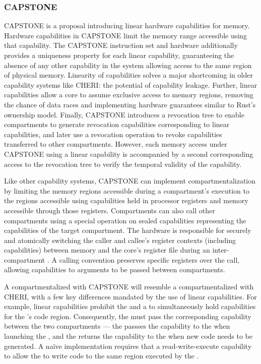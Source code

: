 \subsubsection{CAPSTONE}
CAPSTONE is a proposal introducing linear hardware capabilities for memory.
Hardware capabilities in CAPSTONE limit the memory range accessible
using that capability.
The CAPSTONE instruction set and hardware additionally provides a uniqueness 
property for each linear capability, guaranteeing the absence of any other 
capability in the system allowing access to the same region of 
physical memory.
Linearity of capabilities solves a major shortcoming in older capability
systems like CHERI: the potential of capability leakage.
Further, linear capabilities allow a core to assume exclusive access to
memory regions, removing the chance of data races and implementing
hardware guarantees similar to Rust's ownership model.
Finally, CAPSTONE introduces a revocation tree to enable compartments to
generate revocation capabilities corresponding to linear capabilities,
and later use a revocation operation to revoke capabilities transferred to
other compartments. 
However, each memory access under CAPSTONE using a linear capability is
accompanied by a second corresponding access to the revocation tree to
verify the temporal validity of the capability.

Like other capability systems, CAPSTONE can implement compartmentalization
by limiting the memory regions accessible during a compartment's execution
to the regions accessible using capabilities held in processor registers
and memory accessible through those registers.
Compartments can also call other compartments using a special 
operation on sealed capabilities representing the capabilities of the 
target compartment.
The hardware is responsible for securely and atomically switching the
caller and callee's register contexts (including capabilities) between
memory and the core's register file during an inter-compartment .
A calling convention preserves specific registers over the call, allowing
capabilities to arguments to be passed between compartments.

A \browser compartmentalized with CAPSTONE will resemble a \browser
compartmentalized with CHERI, with a few key differences mandated by the
use of linear capabilities.
For example, linear capabilities prohibit the \renderer and a \sandbox to
simultaneously hold capabilities for the \sandbox{}'s code region.
Consequently, the \browser must pass the corresponding capability between
the two compartments --- the \renderer passses the capability to the
\sandbox when launching the \sandbox, and the \sandbox returns the 
capability to the \renderer when new code needs to be generated.
A na\"ive \browser implementation requires that a read-write-execute
capability to allow the \renderer to write code to the same region executed
by the \sandbox.

